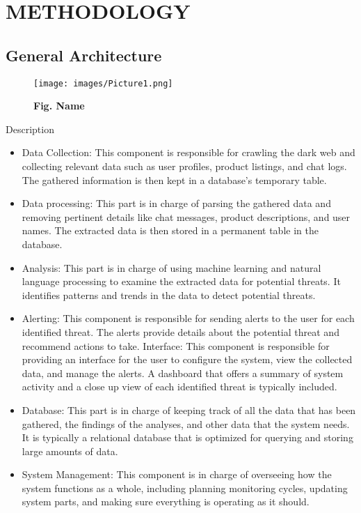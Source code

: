 \documentclass[10pt]{report}
\begin{document}
\chapter{METHODOLOGY}
\linespread{1.5}
\section{General Architecture}
\begin{figure}[H]
 \centering
 \texttt{[image: images/Picture1.png]}
 \caption{\textbf{Fig. Name}}
\end{figure}
Description

\begin{itemize}
    \item Data Collection: This component is responsible for crawling the dark web and collecting relevant data such as user profiles, product listings, and chat logs. The gathered information is then kept in a database's temporary table.
    \item Data processing: This part is in charge of parsing the gathered data and removing pertinent details like chat messages, product descriptions, and user names. The extracted data is then stored in a permanent table in the database.
    \item Analysis: This part is in charge of using machine learning and natural language processing to examine the extracted data for potential threats. It identifies patterns and trends in the data to detect potential threats.
    \item Alerting: This component is responsible for sending alerts to the user for each identified threat. The alerts provide details about the potential threat and recommend actions to take.
    \itemUser Interface: This component is responsible for providing an interface for the user to configure the system, view the collected data, and manage the alerts. A dashboard that offers a summary of system activity and a close up view of each identified threat is typically included.
    \item Database: This part is in charge of keeping track of all the data that has been gathered, the findings of the analyses, and other data that the system needs. It is typically a relational database that is optimized for querying and storing large amounts of data.
    \item System Management: This component is in charge of overseeing how the system functions as a whole, including planning monitoring cycles, updating system parts, and making sure everything is operating as it should.
\end{itemize}
\end{document}
